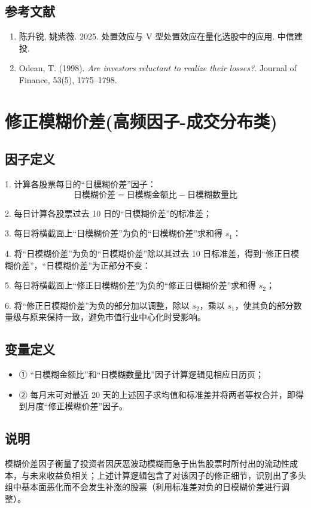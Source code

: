 \documentclass{article}
\begin{document}
\subsection{参考文献}
\begin{enumerate}
    \item 陈升锐, 姚紫薇. 2025. 处置效应与 V 型处置效应在量化选股中的应用. 中信建投.
    \item Odean, T. (1998). \textit{Are investors reluctant to realize their losses?}. Journal of Finance, 53(5), 1775–1798.
\end{enumerate}

\section{修正模糊价差(高频因子-成交分布类)}

\subsection{因子定义}

1. 计算各股票每日的“日模糊价差”因子：
   \begin{equation}
       \text{日模糊价差} = \text{日模糊金额比} - \text{日模糊数量比}
   \end{equation}

2. 每日计算各股票过去 10 日的“日模糊价差”的标准差；

3. 每日将横截面上“日模糊价差”为负的“日模糊价差”求和得 \( s_1 \)：

4. 将“日模糊价差”为负的“日模糊价差”除以其过去 10 日标准差，得到“修正日模糊价差”，“日模糊价差”为正部分不变：

5. 每日将横截面上“修正日模糊价差”为负的“修正日模糊价差”求和得 \( s_2 \)；

6. 将“修正日模糊价差”为负的部分加以调整，除以 \( s_2 \)，乘以 \( s_1 \)，使其负的部分数量级与原来保持一致，避免市值行业中心化时受影响。

\subsection{变量定义}
\begin{itemize}
    \item ① “日模糊金额比”和“日模糊数量比”因子计算逻辑见相应日历页；
    \item ② 每月末可对最近 20 天的上述因子求均值和标准差并将两者等权合并，即得到月度“修正模糊价差”因子。
\end{itemize}

\subsection{说明}
模糊价差因子衡量了投资者因厌恶波动模糊而急于出售股票时所付出的流动性成本，与未来收益负相关；上述计算逻辑包含了对该因子的修正细节，识别出了多头组中基本面恶化而不会发生补涨的股票（利用标准差对负的日模糊价差进行调整）。
\end{document}
